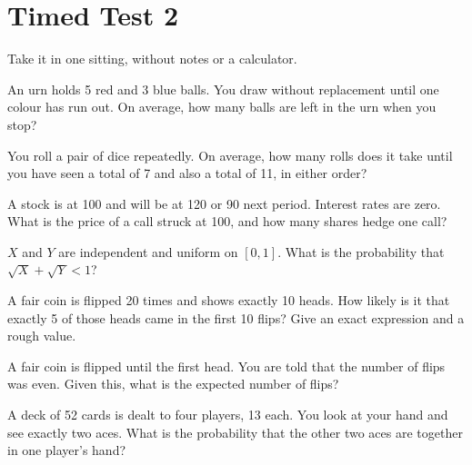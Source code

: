 \chapter{Timed Test 2}\label{ch:iv1:timed-test-2}

\begin{ivtrains}
Take it in one sitting, without notes or a calculator.
\end{ivtrains}


\begin{question}\label{iq:iv1:timed-test-2:1}
An urn holds 5 red and 3 blue balls. You draw without replacement until one colour has run out. On average, how many balls are left in the urn when you stop?
\end{question}

\begin{question}\label{iq:iv1:timed-test-2:2}
You roll a pair of dice repeatedly. On average, how many rolls does it take until you have seen a total of 7 and also a total of 11, in either order?
\end{question}

\begin{question}\label{iq:iv1:timed-test-2:3}
A stock is at 100 and will be at 120 or 90 next period. Interest rates are zero. What is the price of a call struck at 100, and how many shares hedge one call?
\end{question}

\begin{question}\label{iq:iv1:timed-test-2:4}
$X$ and $Y$ are independent and uniform on $[0, 1]$. What is the probability that $\sqrt{X} + \sqrt{Y} < 1$?
\end{question}

\begin{question}\label{iq:iv1:timed-test-2:5}
A fair coin is flipped 20 times and shows exactly 10 heads. How likely is it that exactly 5 of those heads came in the first 10 flips? Give an exact expression and a rough value.
\end{question}

\begin{question}\label{iq:iv1:timed-test-2:6}
A fair coin is flipped until the first head. You are told that the number of flips was even. Given this, what is the expected number of flips?
\end{question}


\begin{question}\label{iq:iv1:timed-test-2:7}
A deck of 52 cards is dealt to four players, 13 each. You look at your hand and see exactly two aces. What is the probability that the other two aces are together in one player's hand?
\end{question}

